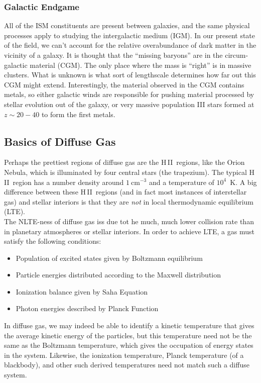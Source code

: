 \documentclass[10pt]{article}
\numberwithin{equation}{section}
\newcommand{\n}{\noindent}
\newcommand{\HII}{H\,II\ }
\begin{document}
\subsubsection{Galactic Endgame} %
\label{ssub:galactic_endgame}
All of the ISM constituents are present between galaxies, and the same physical
processes apply to studying the intergalactic medium (IGM). In our present
state of the field, we can't account for the relative overabundance of dark
matter in the vicinity of a galaxy. It is thought that the ``missing baryons''
are in the circum-galactic material (CGM). The only place where the mass is
``right'' is in massive clusters. What is unknown is what sort of lengthscale
determines how far out this CGM might extend. Interestingly, the material
observed in the CGM contains metals, so either galactic winds are responsible
for pushing material processed by stellar evolution out of the galaxy, or very
massive population III stars formed at $z\sim 20-40$ to form the first metals.
\subsection{Basics of Diffuse Gas} %
\label{sub:basics_of_diffuse_gas}
Perhaps the prettiest regions of diffuse gas are the \HII regions, like the
Orion Nebula, which is illuminated by four central stars (the trapezium). The
typical \HII region has a number density around $1\ \mathrm{cm^{-3}}$ and a
temperature of $10^4$\ K. A big difference between these \HII regions (and in
fact most instances of interstellar gas) and stellar interiors is that they are
\emph{not} in local thermodynamic equilibrium (LTE).\\

\n The NLTE-ness of diffuse gas iss due tot he much, much lower collision rate
than in planetary atmospheres or stellar interiors. In order to achieve LTE, a
gas must satisfy the following conditions:
\begin{itemize}
  \item Population of excited states given by Boltzmann equilibrium
  \item Particle energies distributed according to the Maxwell distribution
  \item Ionization balance given by Saha Equation
  \item Photon energies described by Planck Function
\end{itemize}
In diffuse gas, we may indeed be able to identify a kinetic temperature that
gives the average kinetic energy of the particles, but this temperature need
not be the same as the Boltzmann temperature, which gives the occupation of
energy states in the system. Likewise, the ionization temperature, Planck
temperature (of a blackbody), and other such derived temperatures need not
match such a diffuse system.
\end{document}

